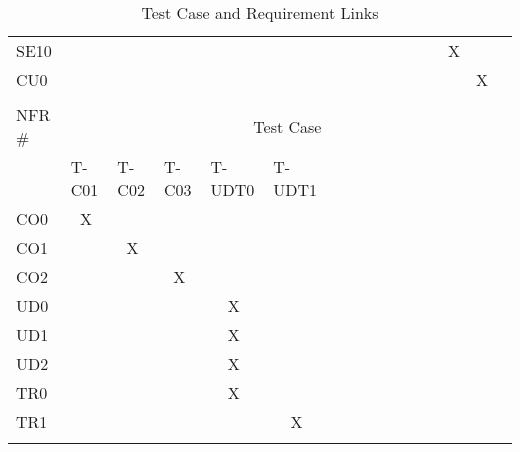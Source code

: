 \documentclass[12pt, titlepage]{article}
\begin{document}
\begin{longtable}{lcccclllllclcccc}
\multicolumn{1}{l|}{SE10} & \multicolumn{1}{l}{} & \multicolumn{1}{l}{} & \multicolumn{1}{l}{} & \multicolumn{1}{l}{} &  &  &  &  &  &  & \multicolumn{1}{c}{} &  & X &  &  \\
\multicolumn{1}{l|}{CU0} & \multicolumn{1}{l}{} & \multicolumn{1}{l}{} & \multicolumn{1}{l}{} & \multicolumn{1}{l}{} &  &  &  &  &  & \multicolumn{1}{l}{} &  & \multicolumn{1}{l}{} & \multicolumn{1}{l}{} & X & \multicolumn{1}{l}{} \\
 & \multicolumn{1}{l}{} & \multicolumn{1}{l}{} & \multicolumn{1}{l}{} & \multicolumn{1}{l}{} &  &  &  &  &  & \multicolumn{1}{l}{} &  & \multicolumn{1}{l}{} & \multicolumn{1}{l}{} & \multicolumn{1}{l}{} & \multicolumn{1}{l}{} \\
\multicolumn{1}{l|}{NFR \#} & \multicolumn{15}{c}{Test Case} \\ \hline
\multicolumn{1}{l|}{} & \multicolumn{1}{l}{T-C01} & \multicolumn{1}{l}{T-C02} & \multicolumn{1}{l}{T-C03} & \multicolumn{1}{l}{T-UDT0} & T-UDT1 &  &  &  &  & \multicolumn{1}{l}{} &  & \multicolumn{1}{l}{} & \multicolumn{1}{l}{} & \multicolumn{1}{l}{} & \multicolumn{1}{l}{} \\
\multicolumn{1}{l|}{CO0} & X & \multicolumn{1}{l}{} & \multicolumn{1}{l}{} & \multicolumn{1}{l}{} &  &  &  &  &  & \multicolumn{1}{l}{} &  & \multicolumn{1}{l}{} & \multicolumn{1}{l}{} & \multicolumn{1}{l}{} & \multicolumn{1}{l}{} \\
\multicolumn{1}{l|}{CO1} &  & X &  &  &  &  &  &  &  & \multicolumn{1}{l}{} &  & \multicolumn{1}{l}{} & \multicolumn{1}{l}{} & \multicolumn{1}{l}{} & \multicolumn{1}{l}{} \\
\multicolumn{1}{l|}{CO2} &  &  & X &  &  &  &  &  &  & \multicolumn{1}{l}{} &  & \multicolumn{1}{l}{} & \multicolumn{1}{l}{} & \multicolumn{1}{l}{} & \multicolumn{1}{l}{} \\
\multicolumn{1}{l|}{UD0} &  &  &  & X &  &  &  &  &  & \multicolumn{1}{l}{} &  & \multicolumn{1}{l}{} & \multicolumn{1}{l}{} & \multicolumn{1}{l}{} & \multicolumn{1}{l}{} \\
\multicolumn{1}{l|}{UD1} &  &  &  & X &  &  &  &  &  & \multicolumn{1}{l}{} &  & \multicolumn{1}{l}{} & \multicolumn{1}{l}{} & \multicolumn{1}{l}{} & \multicolumn{1}{l}{} \\
\multicolumn{1}{l|}{UD2} &  &  &  & X &  &  &  &  &  & \multicolumn{1}{l}{} &  & \multicolumn{1}{l}{} & \multicolumn{1}{l}{} & \multicolumn{1}{l}{} & \multicolumn{1}{l}{} \\
\multicolumn{1}{l|}{TR0} &  &  &  & X &  &  &  &  &  & \multicolumn{1}{l}{} &  & \multicolumn{1}{l}{} & \multicolumn{1}{l}{} & \multicolumn{1}{l}{} & \multicolumn{1}{l}{} \\
\multicolumn{1}{l|}{TR1} &  &  &  &  & \multicolumn{1}{c}{X} & \multicolumn{1}{c}{} &  &  &  & \multicolumn{1}{l}{} &  & \multicolumn{1}{l}{} & \multicolumn{1}{l}{} & \multicolumn{1}{l}{} & \multicolumn{1}{l}{}
\\ \caption{Test Case and Requirement Links}
\end{longtable}
\normalsize
\end{document}
